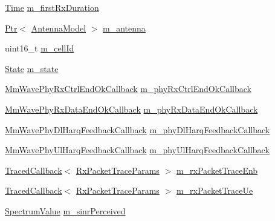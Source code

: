 \begin{DoxyCompactItemize}
\hyperlink{classns3_1_1Time}{Time} \hyperlink{classns3_1_1MmWaveSpectrumPhy_a626a5e0e4410cf0d8deab2f5c3d40626}{m\+\_\+first\+Rx\+Duration}
\item 
\hyperlink{classns3_1_1Ptr}{Ptr}$<$ \hyperlink{classns3_1_1AntennaModel}{Antenna\+Model} $>$ \hyperlink{classns3_1_1MmWaveSpectrumPhy_a1f6c5c95f983a34958e8a768ecd611a1}{m\+\_\+antenna}
\item 
uint16\+\_\+t \hyperlink{classns3_1_1MmWaveSpectrumPhy_ac47302ef0f8154064d84adcc0001d77c}{m\+\_\+cell\+Id}
\item 
\hyperlink{classns3_1_1MmWaveSpectrumPhy_a665335f60416cf031a9b68209e4368ae}{State} \hyperlink{classns3_1_1MmWaveSpectrumPhy_ab6330aa9de7700e7e15b82000335665d}{m\+\_\+state}
\item 
\hyperlink{namespacens3_a147e86a90da3cd02d30b6a913cb786d6}{Mm\+Wave\+Phy\+Rx\+Ctrl\+End\+Ok\+Callback} \hyperlink{classns3_1_1MmWaveSpectrumPhy_a6bc6850143640be8a288b87a94bfbfa2}{m\+\_\+phy\+Rx\+Ctrl\+End\+Ok\+Callback}
\item 
\hyperlink{namespacens3_a3d4932dc40c714b73714c65a086bd622}{Mm\+Wave\+Phy\+Rx\+Data\+End\+Ok\+Callback} \hyperlink{classns3_1_1MmWaveSpectrumPhy_a5a20fb20e63fa38e01bde7d517d33053}{m\+\_\+phy\+Rx\+Data\+End\+Ok\+Callback}
\item 
\hyperlink{namespacens3_af2838cfd552cb02b768db1c514cdbc80}{Mm\+Wave\+Phy\+Dl\+Harq\+Feedback\+Callback} \hyperlink{classns3_1_1MmWaveSpectrumPhy_a59802a12b19c0edc5e05fb84af294221}{m\+\_\+phy\+Dl\+Harq\+Feedback\+Callback}
\item 
\hyperlink{namespacens3_ad991c5321b1aedfbb27717057c344ac9}{Mm\+Wave\+Phy\+Ul\+Harq\+Feedback\+Callback} \hyperlink{classns3_1_1MmWaveSpectrumPhy_a140e487a0f22edbd982eda38a76ac652}{m\+\_\+phy\+Ul\+Harq\+Feedback\+Callback}
\item 
\hyperlink{classns3_1_1TracedCallback}{Traced\+Callback}$<$ \hyperlink{structns3_1_1RxPacketTraceParams}{Rx\+Packet\+Trace\+Params} $>$ \hyperlink{classns3_1_1MmWaveSpectrumPhy_ab0161a801e531b9d95230f4d464640a3}{m\+\_\+rx\+Packet\+Trace\+Enb}
\item 
\hyperlink{classns3_1_1TracedCallback}{Traced\+Callback}$<$ \hyperlink{structns3_1_1RxPacketTraceParams}{Rx\+Packet\+Trace\+Params} $>$ \hyperlink{classns3_1_1MmWaveSpectrumPhy_a9a0b7373bd200aebda3532c70e74e81d}{m\+\_\+rx\+Packet\+Trace\+Ue}
\item 
\hyperlink{classns3_1_1SpectrumValue}{Spectrum\+Value} \hyperlink{classns3_1_1MmWaveSpectrumPhy_a61da15a483343ea141a555b3712db8d7}{m\+\_\+sinr\+Perceived}
\item 

\end{DoxyCompactItemize}
